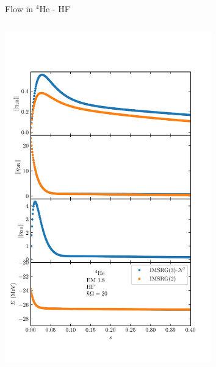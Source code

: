 \documentclass[aspectratio=169]{beamer}
\begin{document}
\begin{frame}{Flow in ${}^{4}\text{He}$ - HF}
  \begin{columns}
    \begin{column}{0.5\textwidth}
      \begin{center}
        \includegraphics[trim=0 1.0cm 0 1.5cm, clip, width=0.7\textwidth]{thesis/talk/images/helium_flow_imsrg2_and_3_eta.pdf}
      \end{center}
    \end{column}
    \begin{column}{0.5\textwidth}
      \begin{center}

\end{center}
\end{column}
\end{columns}
\end{frame}
\end{document}
